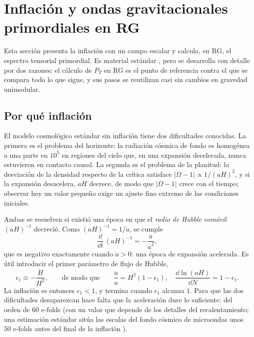 \section{Inflación y ondas gravitacionales primordiales en RG}
\label{sec:inflacion}

Esta sección presenta la inflación con un campo escalar y calcula, en RG, el espectro tensorial primordial. Es material estándar , pero se desarrolla con detalle por dos razones: el cálculo de $P_T$ en RG es el punto de referencia contra el que se compara todo lo que sigue, y sus pasos se reutilizan casi sin cambios en gravedad unimodular.

\subsection{Por qué inflación}

El modelo cosmológico estándar sin inflación tiene dos dificultades conocidas. La primera es el problema del horizonte: la radiación cósmica de fondo es homogénea a una parte en $10^5$ en regiones del cielo que, en una expansión decelerada, nunca estuvieron en contacto causal. La segunda es el problema de la planitud: la desviación de la densidad respecto de la crítica satisface $|\Omega-1|\propto 1/(aH)^2$, y si la expansión desacelera, $aH$ decrece, de modo que $|\Omega-1|$ crece con el tiempo; observar hoy un valor pequeño exige un ajuste fino extremo de las condiciones iniciales.

Ambas se resuelven si existió una época en que el \emph{radio de Hubble comóvil} $(aH)^{-1}$ decreció. Como $(aH)^{-1}=1/\dot a$, se cumple
\begin{equation}
\frac{\dd}{\dd t}\,(aH)^{-1}=-\frac{\ddot a}{\dot a^2},
\label{eq:radioHubble}
\end{equation}
que es negativo exactamente cuando $\ddot a>0$: una época de expansión acelerada. Es útil introducir el primer parámetro de flujo de Hubble,
\begin{equation}
\epsilon_1\equiv-\frac{\dot H}{H^2},\qquad\text{de modo que}\qquad \frac{\ddot a}{a}=H^2(1-\epsilon_1),\quad \frac{\dd\ln(aH)}{\dd N}=1-\epsilon_1.
\label{eq:eps1def}
\end{equation}
La inflación es entonces $\epsilon_1<1$, y termina cuando $\epsilon_1$ alcanza $1$. Para que las dos dificultades desaparezcan hace falta que la aceleración dure lo suficiente: del orden de $60$ e-folds \cite{leon22} (con un valor que depende de los detalles del recalentamiento; una estimación estándar sitúa las escalas del fondo cósmico de microondas unos $50$ e-folds antes del final de la inflación \cite{baumann22}).

